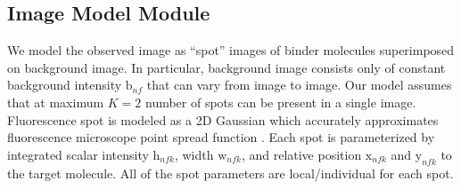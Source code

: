 

\subsection{Image Model Module} 

We model the observed image as ``spot'' images of binder molecules superimposed on background image. In particular, background image consists only of constant background intensity $\mathrm{b}_{nf}$ that can vary from image to image. Our model assumes that at maximum $K=2$ number of spots can be present in a single image.  Fluorescence spot is modeled as a 2D Gaussian which accurately approximates fluorescence microscope point spread function \cite{Zhang2007-rb}. Each spot is parameterized by integrated scalar intensity $\mathrm{h}_{nfk}$, width $\mathrm{w}_{nfk}$, and relative position $\mathrm{x}_{nfk}$ and $\mathrm{y}_{nfk}$ to the target molecule. All of the spot parameters are local/individual for each spot.

